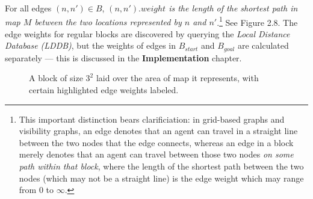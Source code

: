 \documentclass[12pt,notitlepage]{report}
\begin{document}
\noindent For all edges $(n,n') \in B$, {\em $(n,n').weight$ is the length of the shortest path in map $M$ between the two locations represented by $n$ and $n'$}.\footnote{This important distinction bears clarificiation: in grid-based graphs and visibility graphs, an edge denotes that an agent can travel in a straight line between the two nodes that the edge connects, whereas an edge in a block merely denotes that an agent can travel between those two nodes {\em on some path within that block}, where the length of the shortest path between the two nodes (which may not be a straight line) is the edge weight which may range from $0$ to $\infty$.} See Figure 2.8. The edge weights for regular blocks are discovered by querying the {\em Local Distance Database (LDDB)}, but the weights of edges in $B_{start}$ and $B_{goal}$ are calculated separately --- this is discussed in the {\bfseries Implementation} chapter.\\

\begin{figure}
    \centering
    \caption[Anatomy of a block]{A block of size $3^{2}$ laid over the area of map it represents, with certain highlighted edge weights labeled.}
\end{figure}
\end{document}
